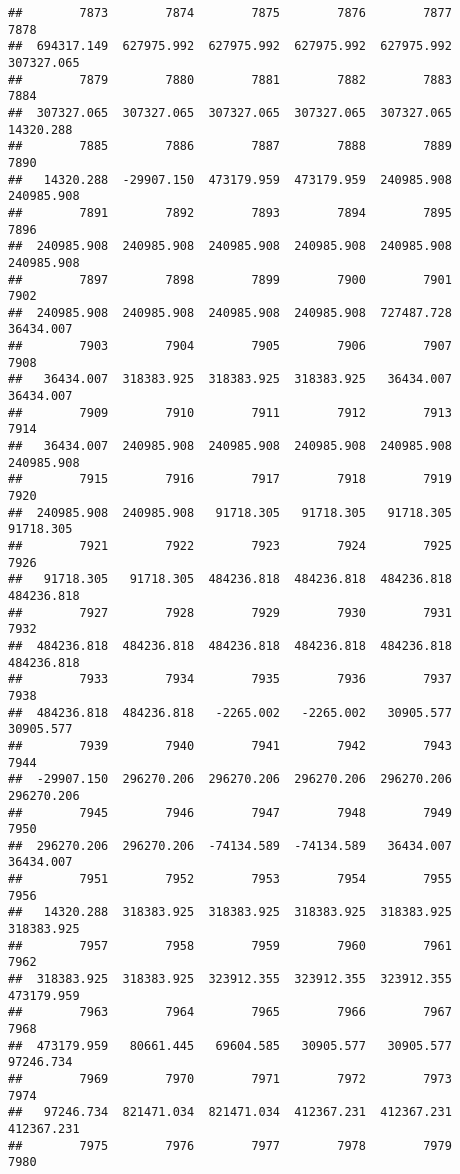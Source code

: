 \documentclass[
]{book}
\begin{document}
\begin{verbatim}
##        7873        7874        7875        7876        7877        7878 
##  694317.149  627975.992  627975.992  627975.992  627975.992  307327.065 
##        7879        7880        7881        7882        7883        7884 
##  307327.065  307327.065  307327.065  307327.065  307327.065   14320.288 
##        7885        7886        7887        7888        7889        7890 
##   14320.288  -29907.150  473179.959  473179.959  240985.908  240985.908 
##        7891        7892        7893        7894        7895        7896 
##  240985.908  240985.908  240985.908  240985.908  240985.908  240985.908 
##        7897        7898        7899        7900        7901        7902 
##  240985.908  240985.908  240985.908  240985.908  727487.728   36434.007 
##        7903        7904        7905        7906        7907        7908 
##   36434.007  318383.925  318383.925  318383.925   36434.007   36434.007 
##        7909        7910        7911        7912        7913        7914 
##   36434.007  240985.908  240985.908  240985.908  240985.908  240985.908 
##        7915        7916        7917        7918        7919        7920 
##  240985.908  240985.908   91718.305   91718.305   91718.305   91718.305 
##        7921        7922        7923        7924        7925        7926 
##   91718.305   91718.305  484236.818  484236.818  484236.818  484236.818 
##        7927        7928        7929        7930        7931        7932 
##  484236.818  484236.818  484236.818  484236.818  484236.818  484236.818 
##        7933        7934        7935        7936        7937        7938 
##  484236.818  484236.818   -2265.002   -2265.002   30905.577   30905.577 
##        7939        7940        7941        7942        7943        7944 
##  -29907.150  296270.206  296270.206  296270.206  296270.206  296270.206 
##        7945        7946        7947        7948        7949        7950 
##  296270.206  296270.206  -74134.589  -74134.589   36434.007   36434.007 
##        7951        7952        7953        7954        7955        7956 
##   14320.288  318383.925  318383.925  318383.925  318383.925  318383.925 
##        7957        7958        7959        7960        7961        7962 
##  318383.925  318383.925  323912.355  323912.355  323912.355  473179.959 
##        7963        7964        7965        7966        7967        7968 
##  473179.959   80661.445   69604.585   30905.577   30905.577   97246.734 
##        7969        7970        7971        7972        7973        7974 
##   97246.734  821471.034  821471.034  412367.231  412367.231  412367.231 
##        7975        7976        7977        7978        7979        7980 

\end{verbatim}
\end{document}
